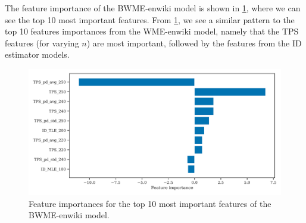 The feature importance of the BWME-enwiki model is shown in \cref{fig:bwme-enwiki-feature-importances}, where we can see the top 10 most important features. From \cref{fig:bwme-enwiki-feature-importances}, we see a similar pattern to the top 10 features importances from the WME-enwiki model, namely that the TPS features (for varying $n$) are most important, followed by the features from the ID estimator models.
\begin{figure}[H]
    \centering
    \includegraphics[width=\textwidth]{thesis/figures/bwme-enwiki-top-10-feature-importances.pdf}
    \caption{Feature importances for the top 10 most important features of the BWME-enwiki model.}
    \label{fig:bwme-enwiki-feature-importances}
\end{figure}

